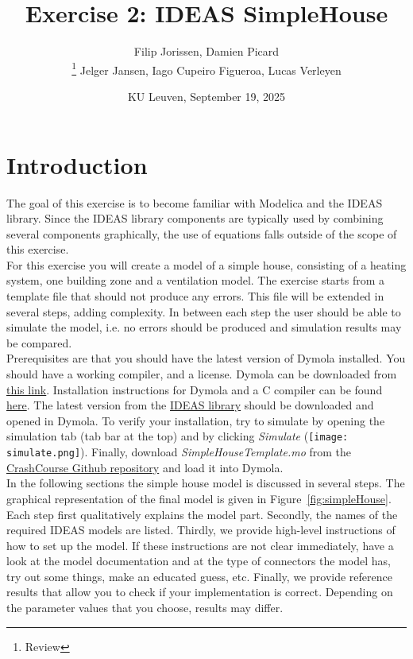 \documentclass[10pt,a4paper]{article}
\begin{document}
\title{Exercise 2: IDEAS SimpleHouse}
\author{Filip Jorissen, Damien Picard\\ \thanks{Review} Jelger Jansen, Iago Cupeiro Figueroa, Lucas Verleyen}
\date{KU Leuven, September 19, 2025}
\maketitle

\doclicenseThis

\section*{Introduction}
The goal of this exercise is to become familiar with 
Modelica and the IDEAS library. 
Since the IDEAS library components are typically used
by combining several components graphically, the use of 
equations falls outside of the scope of this exercise.\\

For this exercise you will create a model of a simple house,
consisting of a heating system, one building zone 
and a ventilation model. 
The exercise starts from a template file that should 
not produce any errors. This file will be extended in
several steps, adding complexity.
In between each step the user should be able to simulate the
model, i.e. no errors should be produced and simulation results 
may be compared.\\

Prerequisites are that you should have the latest version of Dymola
installed. You should have a working compiler, and a license. 
Dymola can be downloaded from 
\href{http://www.3ds.com/products-services/catia/products/dymola/trial-version/}{this link}. 
Installation instructions for Dymola and a C compiler can be found 
\href{http://www.3ds.com/fileadmin/PRODUCTS/CATIA/DYMOLA/PDF/Installation.pdf}{here}.
The latest version from the \href{https://github.com/open-ideas/IDEAS}{IDEAS library} should be downloaded and opened in Dymola. 
To verify your installation, try to simulate  by opening the simulation tab (tab bar at the top) and by clicking \textit{Simulate} (\texttt{[image: simulate.png]}). Finally, download 
\textit{SimpleHouseTemplate.mo} from the \href{https://github.com/open-ideas/__CrashCourse__/tree/master/Exercises/Exercise%202}{CrashCourse Github repository}
and load it into Dymola.\\

In the following sections the simple house model is discussed 
in several steps. The graphical representation of the final model is 
given in Figure~\ref{fig:simpleHouse}.
Each step first qualitatively explains the model part.
Secondly, the names of the required IDEAS models 
are listed.
Thirdly, we provide high-level instructions of how to
set up the model.
If these instructions are not clear immediately, 
have a look at the model documentation and at the type of
connectors the model has, 
try out some things, 
make an educated guess, etc.
Finally, we provide reference results that allow you to check
if your implementation is correct. 
Depending on the parameter values that you choose, results
may differ.
\end{document}

